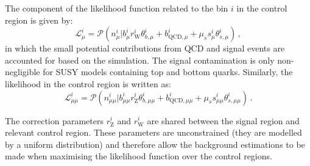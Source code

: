 The component of the likelihood function related to the \njnbht bin $i$ in the 
\mj control region is given by:
\begin{equation}
\mathcal{L}_\mu^i = \mathcal{P}\left( n_\mu^i \bigg\rvert 
b_\mu^i r_{\mathrm{W}}^i \theta_{b,\mu}^i + 
b_{\mathrm{QCD},\mu}^i + 
\mu_s s_\mu^i \theta_{s,\mu}^i \right) \, ,
\end{equation}
in which the small potential contributions from QCD and signal events are 
accounted for based on the simulation. The signal contamination is only 
non-negligible for SUSY models containing top and bottom quarks. 
Similarly, the likelihood in the \mmj control region is written as:
\begin{equation}
\mathcal{L}_{\mu\mu}^i = \mathcal{P}\left( n_{\mu\mu}^i \bigg\rvert 
b_{\mu\mu}^i r_{\mathrm{Z}}^i \theta_{b,\mu\mu}^i + 
b_{\mathrm{QCD},\mu\mu}^i + 
\mu_s s_{\mu\mu}^i \theta_{s,\mu\mu}^i \right) \, .
\end{equation}

The correction parameters $r_{\mathrm{Z}}^i$ and $r_{\mathrm{W}}^i$ are shared 
between the signal region and relevant control region. These parameters are 
unconstrained (they are modelled by a uniform distribution) and therefore allow 
the background estimations to be made when maximising the likelihood function 
over the control regions.

